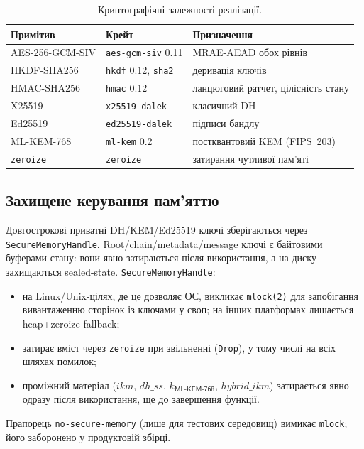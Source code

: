 \documentclass[11pt,a4paper]{article}
\theoremstyle{definition}
\newcommand{\KEM}{\textsf{ML-KEM-768}}
\begin{document}
\begin{table}[H]
\centering
\caption{Криптографічні залежності реалізації.}\label{tab:libs}
\small
\begin{tabularx}{\textwidth}{@{}llX@{}}
\toprule
Примітив & Крейт & Призначення \\
\midrule
AES-256-GCM-SIV & \texttt{aes-gcm-siv} 0.11 & MRAE-AEAD обох рівнів \\
HKDF-SHA256 & \texttt{hkdf} 0.12, \texttt{sha2} & деривація ключів \\
HMAC-SHA256 & \texttt{hmac} 0.12 & ланцюговий ратчет, цілісність стану \\
X25519 & \texttt{x25519-dalek} & класичний DH \\
Ed25519 & \texttt{ed25519-dalek} & підписи бандлу \\
ML-KEM-768 & \texttt{ml-kem} 0.2 & постквантовий KEM (FIPS~203) \\
\texttt{zeroize} & \texttt{zeroize} & затирання чутливої пам'яті \\
\bottomrule
\end{tabularx}
\end{table}

\subsection{Захищене керування пам'яттю}\label{sec:secmem}

Довгострокові приватні DH/KEM/Ed25519 ключі зберігаються через
\texttt{SecureMemoryHandle}. Root/chain/metadata/message ключі є
байтовими буферами стану: вони явно затираються після використання, а
на диску захищаються sealed-state. \texttt{SecureMemoryHandle}:
\begin{itemize}
  \item на Linux/Unix-цілях, де це дозволяє ОС, викликає \texttt{mlock(2)}
    для запобігання вивантаженню сторінок із ключами у своп; на інших
    платформах лишається heap+zeroize fallback;
  \item затирає вміст через \texttt{zeroize} при звільненні
    (\texttt{Drop}), у тому числі на всіх шляхах помилок;
  \item проміжний матеріал ($\mathit{ikm}$, $\mathit{dh\_ss}$,
    $k_{\KEM}$, $\mathit{hybrid\_ikm}$) затирається явно одразу
    після використання, ще до завершення функції.
\end{itemize}
Прапорець \texttt{no-secure-memory} (лише для тестових середовищ)
вимикає \texttt{mlock}; його заборонено у продуктовій збірці.
\end{document}
